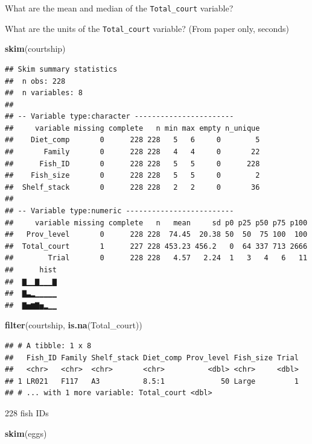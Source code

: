 \documentclass[]{book}
\newenvironment{Shaded}{\begin{snugshade}}{\end{snugshade}}
\newcommand{\KeywordTok}[1]{\textcolor[rgb]{0.13,0.29,0.53}{\textbf{#1}}}
\newcommand{\NormalTok}[1]{#1}
\begin{document}
What are the mean and median of the \texttt{Total\_court} variable?

What are the units of the \texttt{Total\_court} variable? (From paper only, seconds)

\begin{Shaded}
\begin{Highlighting}[]
\KeywordTok{skim}\NormalTok{(courtship)}
\end{Highlighting}
\end{Shaded}

\begin{verbatim}
## Skim summary statistics
##  n obs: 228 
##  n variables: 8 
## 
## -- Variable type:character -----------------------
##     variable missing complete   n min max empty n_unique
##    Diet_comp       0      228 228   5   6     0        5
##       Family       0      228 228   4   4     0       22
##      Fish_ID       0      228 228   5   5     0      228
##    Fish_size       0      228 228   5   5     0        2
##  Shelf_stack       0      228 228   2   2     0       36
## 
## -- Variable type:numeric -------------------------
##     variable missing complete   n   mean     sd p0 p25 p50 p75 p100
##   Prov_level       0      228 228  74.45  20.38 50  50  75 100  100
##  Total_court       1      227 228 453.23 456.2   0  64 337 713 2666
##        Trial       0      228 228   4.57   2.24  1   3   4   6   11
##      hist
##  ▇▁▁▇▁▁▁▇
##  ▇▃▂▁▁▁▁▁
##  ▇▅▆▇▅▂▁▁
\end{verbatim}

\begin{Shaded}
\begin{Highlighting}[]
\KeywordTok{filter}\NormalTok{(courtship, }\KeywordTok{is.na}\NormalTok{(Total_court))}
\end{Highlighting}
\end{Shaded}

\begin{verbatim}
## # A tibble: 1 x 8
##   Fish_ID Family Shelf_stack Diet_comp Prov_level Fish_size Trial
##   <chr>   <chr>  <chr>       <chr>          <dbl> <chr>     <dbl>
## 1 LR021   F117   A3          8.5:1             50 Large         1
## # ... with 1 more variable: Total_court <dbl>
\end{verbatim}

228 fish IDs

\begin{Shaded}
\begin{Highlighting}[]
\KeywordTok{skim}\NormalTok{(eggs)}
\end{Highlighting}
\end{Shaded}
\end{document}
